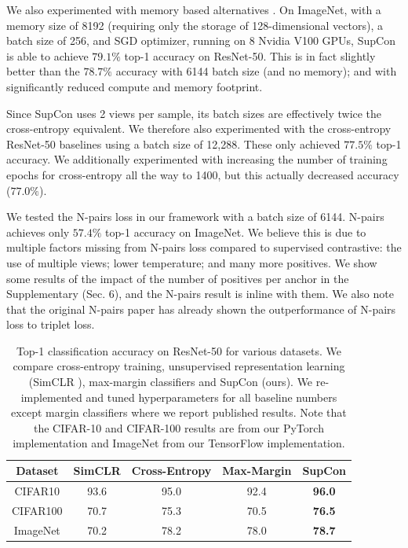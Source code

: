 We also experimented with memory based alternatives \cite{he2019momentum}. On ImageNet, with a memory size of 8192 (requiring only the storage of 128-dimensional vectors), a batch size of 256, and SGD optimizer, running on 8 Nvidia V100 GPUs, SupCon is able to achieve $79.1\%$ top-1 accuracy on ResNet-50. This is in fact slightly better than the $78.7\%$ accuracy with 6144 batch size (and no memory);
and with significantly reduced compute and memory footprint.

Since SupCon uses 2 views per sample, its batch sizes are effectively twice the cross-entropy equivalent. We therefore also experimented with the cross-entropy ResNet-50 baselines using a batch size of 12,288. These only achieved $77.5\%$ top-1 accuracy. We additionally experimented with increasing the number of training epochs for cross-entropy all the way to 1400, but this actually decreased accuracy ($77.0\%$).

We tested the N-pairs loss \cite{sohn2016improved} in our framework with a batch size of 6144. N-pairs achieves only $57.4\%$ top-1 accuracy on ImageNet. We believe this is due to multiple factors missing from N-pairs loss compared to supervised contrastive: the use of multiple views; lower temperature; and many more positives. We show some results of the impact of the number of positives per anchor in the Supplementary (Sec. 6), and the N-pairs result is inline with them. We also note that the original N-pairs paper \cite{sohn2016improved} has already shown the outperformance of N-pairs loss to triplet loss. 

\begin{table}[t]
    \centering
     \vspace{-5pt}
    \begin{tabular}{ccccc}
        \toprule
        Dataset & SimCLR\cite{chen2020simple} & Cross-Entropy & Max-Margin \cite{liu2016largemargin}  &  SupCon \\\midrule
        CIFAR10  & 93.6 & 95.0 & 92.4 & \bf{96.0} \\
        CIFAR100 & 70.7 & 75.3 & 70.5 & \bf{76.5} \\
        ImageNet & 70.2 & 78.2 & 78.0 & \bf{78.7} \\
        \bottomrule
    \end{tabular}
    \vspace{2mm}
    \caption{Top-1 classification accuracy on ResNet-50 \cite{he2016deep} for various datasets. We compare cross-entropy training, unsupervised representation learning (SimCLR \cite{chen2020simple}), max-margin classifiers \cite{liu2016largemargin} and SupCon (ours). We re-implemented and tuned hyperparameters for all baseline numbers except margin classifiers where we report published results.  Note that the CIFAR-10 and CIFAR-100 results are from our PyTorch implementation and ImageNet from our TensorFlow implementation.}
    \vspace{-5pt}
    \label{tab:datasets}
\end{table}


